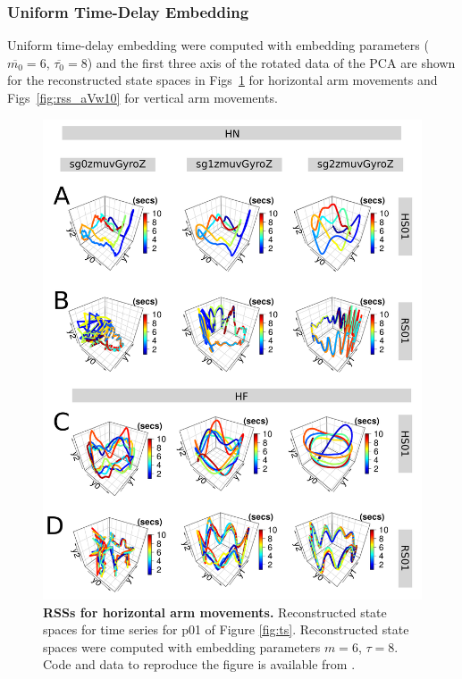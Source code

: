 \documentclass[fleqn,10pt]{wlscirep}
\begin{document}
\subsubsection*{Uniform Time-Delay Embedding}
Uniform time-delay embedding were computed with
embedding parameters ($\overline{m_0}=6$, $\overline{\tau_0}=8$) and 
the first three axis of the rotated data of the PCA are shown 
for the reconstructed state spaces in 
Figs~\ref{fig:rss_aHw10} for horizontal arm movements and 
Figs~\ref{fig:rss_aVw10} for vertical arm movements.
\begin{figure}[ht]
\centering
\includegraphics[width=1.0\textwidth]{figures/rss/pdf/fig3}
\caption{
	{\bf RSSs for horizontal arm movements.}
	Reconstructed state spaces for time series for p01 of Figure \ref{fig:ts}.
	Reconstructed state spaces were computed with 
	embedding parameters $m=6$, $\tau=8$.
	Code and data to reproduce the figure is available from \cite{srep2019}.
        }
    \label{fig:rss_aHw10}
\end{figure}
\end{document}
